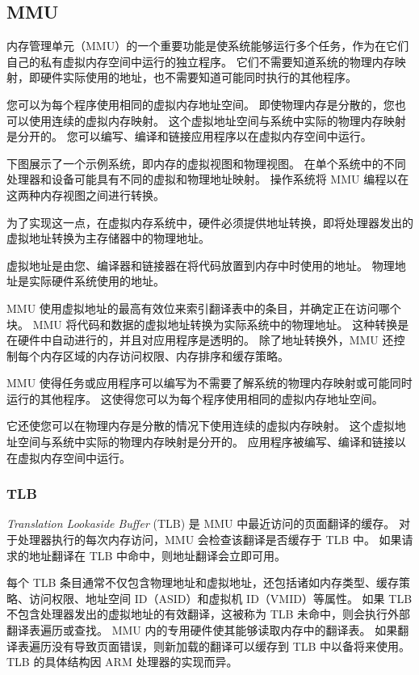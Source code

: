 \subsection{MMU}

内存管理单元（MMU）的一个重要功能是使系统能够运行多个任务，作为在它们自己的私有虚拟内存空间中运行的独立程序。
它们不需要知道系统的物理内存映射，即硬件实际使用的地址，也不需要知道可能同时执行的其他程序。


您可以为每个程序使用相同的虚拟内存地址空间。
即使物理内存是分散的，您也可以使用连续的虚拟内存映射。
这个虚拟地址空间与系统中实际的物理内存映射是分开的。
您可以编写、编译和链接应用程序以在虚拟内存空间中运行。

下图展示了一个示例系统，即内存的虚拟视图和物理视图。
在单个系统中的不同处理器和设备可能具有不同的虚拟和物理地址映射。
操作系统将 MMU 编程以在这两种内存视图之间进行转换。


为了实现这一点，在虚拟内存系统中，硬件必须提供地址转换，即将处理器发出的虚拟地址转换为主存储器中的物理地址。

虚拟地址是由您、编译器和链接器在将代码放置到内存中时使用的地址。
物理地址是实际硬件系统使用的地址。

MMU 使用虚拟地址的最高有效位来索引翻译表中的条目，并确定正在访问哪个块。
MMU 将代码和数据的虚拟地址转换为实际系统中的物理地址。
这种转换是在硬件中自动进行的，并且对应用程序是透明的。
除了地址转换外，MMU 还控制每个内存区域的内存访问权限、内存排序和缓存策略。


MMU 使得任务或应用程序可以编写为不需要了解系统的物理内存映射或可能同时运行的其他程序。
这使得您可以为每个程序使用相同的虚拟内存地址空间。

它还使您可以在物理内存是分散的情况下使用连续的虚拟内存映射。
这个虚拟地址空间与系统中实际的物理内存映射是分开的。
应用程序被编写、编译和链接以在虚拟内存空间中运行。

\subsubsection{TLB}

\textit{Translation Lookaside Buffer} (TLB) 是 MMU 中最近访问的页面翻译的缓存。
对于处理器执行的每次内存访问，MMU 会检查该翻译是否缓存于 TLB 中。
如果请求的地址翻译在 TLB 中命中，则地址翻译会立即可用。

每个 TLB 条目通常不仅包含物理地址和虚拟地址，还包括诸如内存类型、缓存策略、访问权限、地址空间 ID（ASID）和虚拟机 ID（VMID）等属性。
如果 TLB 不包含处理器发出的虚拟地址的有效翻译，这被称为 TLB 未命中，则会执行外部翻译表遍历或查找。
MMU 内的专用硬件使其能够读取内存中的翻译表。
如果翻译表遍历没有导致页面错误，则新加载的翻译可以缓存到 TLB 中以备将来使用。
TLB 的具体结构因 ARM 处理器的实现而异。

